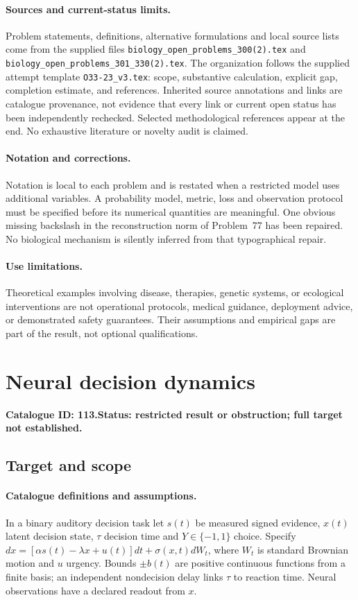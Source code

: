 \documentclass[11pt]{article}
\begin{document}
\paragraph{Sources and current-status limits.}
Problem statements, definitions, alternative formulations and local source lists
come from the supplied files
\texttt{biology\_open\_problems\_300(2).tex} and
\texttt{biology\_open\_problems\_301\_330(2).tex}.
The organization follows the supplied attempt template
\texttt{O33-23\_v3.tex}: scope, substantive calculation, explicit gap,
completion estimate, and references. Inherited source annotations and links are
catalogue provenance, not evidence that every link or current open status has
been independently rechecked. Selected methodological references appear at the
end. No exhaustive literature or novelty audit is claimed.

\paragraph{Notation and corrections.}
Notation is local to each problem and is restated when a restricted model uses
additional variables. A probability model, metric, loss and observation protocol
must be specified before its numerical quantities are meaningful. One obvious
missing backslash in the reconstruction norm of Problem~77 has been repaired.
No biological mechanism is silently inferred from that typographical repair.

\paragraph{Use limitations.}
Theoretical examples involving disease, therapies, genetic systems, or ecological
interventions are not operational protocols, medical guidance, deployment advice,
or demonstrated safety guarantees. Their assumptions and empirical gaps are part
of the result, not optional qualifications.

\setcounter{section}{112}
\section{Neural decision dynamics}
\label{prob:113}
\noindent\textbf{Catalogue ID: 113.}\quad \textbf{Status: restricted result or obstruction; full target not established.}
\subsection{Target and scope}
\paragraph{Catalogue definitions and assumptions.}
In a binary auditory decision task let $s(t)$ be measured signed evidence, $x(t)$ latent decision state, $\tau$ decision time and $Y\in\{-1,1\}$ choice. Specify $dx=[\alpha s(t)-\lambda x+u(t)]dt+\sigma(x,t)dW_t$, where $W_t$ is standard Brownian motion and $u$ urgency. Bounds $\pm b(t)$ are positive continuous functions from a finite basis; an independent nondecision delay links $\tau$ to reaction time. Neural observations have a declared readout from $x$.
\end{document}
